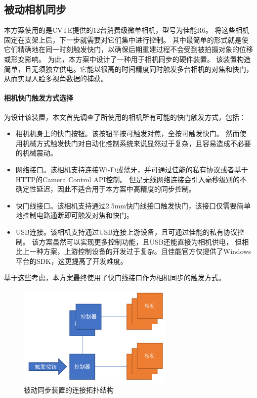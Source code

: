 \subsection{被动相机同步}
\label{sec:passive_sync}

本方案使用的是CVTE提供的12台消费级微单相机，型号为佳能R6。
将这些相机固定在支架上后，下一步就需要对它们集中进行控制。
其中最简单的形式就是使它们精确地在同一时刻触发快门，以确保后期重建过程不会受到被拍摄对象的位移或形变影响。
为此，本方案中设计了一种用于相机同步的硬件装置。
该装置构造简单，且无须独立供电。它能以很高的时间精度同时触发多台相机的对焦和快门，从而实现人脸多视角数据的捕获。

\paragraph{相机快门触发方式选择}

为设计该装置，本文首先调查了所使用的相机所有可能的快门触发方式，包括：
\begin{itemize}
\item 相机机身上的快门按钮。该按钮半按可触发对焦，全按可触发快门。
然而使用机械方式触发快门对自动化控制系统来说显然过于复杂，且容易造成不必要的机械震动。
\item 网络接口。该相机支持连接Wi-Fi或蓝牙，并可通过佳能的私有协议或者基于HTTP的Camera Control API控制。
但是无线网络连接会引入毫秒级别的不确定性延迟，因此不适合用于本方案中高精度的同步控制。
\item 快门线接口。该相机支持通过2.5mm快门线接口触发快门，该接口仅需要简单地控制电路通断即可触发对焦和快门。
\item USB连接。该相机支持通过USB连接上游设备，且可通过佳能的私有协议控制。
该方案虽然可以实现更多控制功能，且USB还能直接为相机供电，
但相比上一种方案，上游控制设备的开发过于复杂。且佳能官方仅提供了Windows平台的SDK，这更提高了开发难度。
\end{itemize}
基于这些考虑，本方案最终使用了快门线接口作为相机同步的触发方式。

\begin{figure}
    \centering
    \includegraphics[height=5cm]{figures/passive_sync_topo}
    \caption{被动同步装置的连接拓扑结构}
    \label{fig:passive_sync_topo}
\end{figure}

